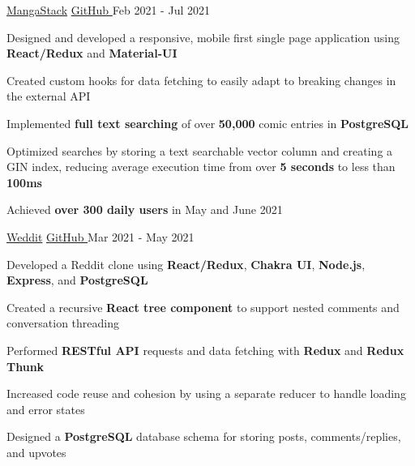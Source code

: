 
\begin{cventries}
  \cventry
    {\fontsize{10pt}{1em}\bodyfont\upshape{}} %
    {\href{https://mangastack.cf/}{MangaStack}} %
    {\href{https://github.com/tacticaltofu/mangastack}{GitHub \faExternalLink}} %
    {Feb 2021 - Jul 2021} %
    {
      \begin{cvitems} %
        \item {Designed and developed a responsive, mobile first single page application using \textbf{React/Redux} and \textbf{Material-UI}}
        \item {Created custom hooks for data fetching to easily adapt to breaking changes in the external API}
        \item {Implemented \textbf{full text searching} of over \textbf{50,000} comic entries in \textbf{PostgreSQL}}
        \item {Optimized searches by storing a text searchable vector column and creating a GIN index, reducing average execution time from over \textbf{5 seconds} to less than \textbf{100ms}}
        \item {Achieved \textbf{over 300 daily users} in May and June 2021}
      \end{cvitems}
    }
    
  \cventry
    {\fontsize{10pt}{1em}\bodyfont\upshape{}} %
    {\href{https://weddit.netlify.app/}{Weddit}} %
    {\href{https://github.com/tacticaltofu/reddit-clone}{GitHub \faExternalLink}} %
    {Mar 2021 - May 2021} %
    {
      \begin{cvitems} %
        \item {Developed a Reddit clone using \textbf{React/Redux}, \textbf{Chakra UI}, \textbf{Node.js}, \textbf{Express}, and \textbf{PostgreSQL}}
        \item {Created a recursive \textbf{React tree component} to support nested comments and conversation threading}
        \item {Performed \textbf{RESTful API} requests and data fetching with \textbf{Redux} and \textbf{Redux Thunk}}
        \item {Increased code reuse and cohesion by using a separate reducer to handle loading and error states}
        \item {Designed a \textbf{PostgreSQL} database schema for storing posts, comments/replies, and upvotes}
      \end{cvitems}
    }
\end{cventries}